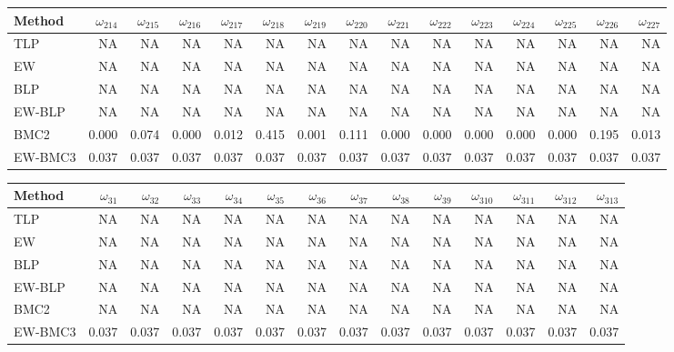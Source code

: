 \documentclass[
]{article}
\begin{document}
\begin{tabular}{lrrrrrrrrrrrrrr}
\toprule
Method & $\omega_{214}$ & $\omega_{215}$ & $\omega_{216}$ & $\omega_{217}$ & $\omega_{218}$ & $\omega_{219}$ & $\omega_{220}$ & $\omega_{221}$ & $\omega_{222}$ & $\omega_{223}$ & $\omega_{224}$ & $\omega_{225}$ & $\omega_{226}$ & $\omega_{227}$\\
\midrule
TLP & NA & NA & NA & NA & NA & NA & NA & NA & NA & NA & NA & NA & NA & NA\\
EW & NA & NA & NA & NA & NA & NA & NA & NA & NA & NA & NA & NA & NA & NA\\
BLP & NA & NA & NA & NA & NA & NA & NA & NA & NA & NA & NA & NA & NA & NA\\
EW-BLP & NA & NA & NA & NA & NA & NA & NA & NA & NA & NA & NA & NA & NA & NA\\
BMC2 & 0.000 & 0.074 & 0.000 & 0.012 & 0.415 & 0.001 & 0.111 & 0.000 & 0.000 & 0.000 & 0.000 & 0.000 & 0.195 & 0.013\\
EW-BMC3 & 0.037 & 0.037 & 0.037 & 0.037 & 0.037 & 0.037 & 0.037 & 0.037 & 0.037 & 0.037 & 0.037 & 0.037 & 0.037 & 0.037\\
\bottomrule
\end{tabular}

\begin{tabular}{lrrrrrrrrrrrrr}
\toprule
Method & $\omega_{31}$ & $\omega_{32}$ & $\omega_{33}$ & $\omega_{34}$ & $\omega_{35}$ & $\omega_{36}$ & $\omega_{37}$ & $\omega_{38}$ & $\omega_{39}$ & $\omega_{310}$ & $\omega_{311}$ & $\omega_{312}$ & $\omega_{313}$\\
\midrule
TLP & NA & NA & NA & NA & NA & NA & NA & NA & NA & NA & NA & NA & NA\\
EW & NA & NA & NA & NA & NA & NA & NA & NA & NA & NA & NA & NA & NA\\
BLP & NA & NA & NA & NA & NA & NA & NA & NA & NA & NA & NA & NA & NA\\
EW-BLP & NA & NA & NA & NA & NA & NA & NA & NA & NA & NA & NA & NA & NA\\
BMC2 & NA & NA & NA & NA & NA & NA & NA & NA & NA & NA & NA & NA & NA\\
EW-BMC3 & 0.037 & 0.037 & 0.037 & 0.037 & 0.037 & 0.037 & 0.037 & 0.037 & 0.037 & 0.037 & 0.037 & 0.037 & 0.037\\
\bottomrule
\end{tabular}
\end{document}
